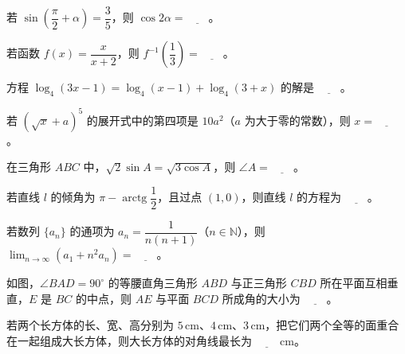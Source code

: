 \begin{question}
若 $\sin\left(\dfrac{\pi}{2}+\alpha\right)=\dfrac{3}{5}$，则 $\cos 2\alpha=\underline{\qquad}$。

\end{question}
\begin{question}
若函数 $f(x)=\dfrac{x}{x+2}$，则 $f^{-1}\left(\dfrac{1}{3}\right)=\underline{\qquad}$。

\end{question}
\begin{question}
方程 $\log_4(3x-1)=\log_4(x-1)+\log_4(3+x)$ 的解是 $\underline{\qquad}$。

\end{question}
\begin{question}
若 $(\sqrt{x}+a)^5$ 的展开式中的第四项是 $10a^2$（$a$ 为大于零的常数），则 $x=\underline{\qquad}$。

\end{question}
\begin{question}
在三角形 $ABC$ 中，$\sqrt{2}\sin A=\sqrt{3\cos A}$，则 $\angle A=\underline{\qquad}$。

\end{question}
\begin{question}
若直线 $l$ 的倾角为 $\pi-\operatorname{arctg}\dfrac{1}{2}$，且过点 $(1,0)$，则直线 $l$ 的方程为 $\underline{\qquad}$。

\end{question}
\begin{question}
若数列 $\{a_n\}$ 的通项为 $a_n=\dfrac{1}{n(n+1)}$（$n\in\mathbb{N}$），则 $\displaystyle\lim_{n\to\infty}(a_1+n^2a_n)=\underline{\qquad}$。

\Needspace{0.4\textheight}
\end{question}
\begin{question}
如图，$\angle BAD=90^\circ$ 的等腰直角三角形 $ABD$ 与正三角形 $CBD$ 所在平面互相垂直，$E$ 是 $BC$ 的中点，则 $AE$ 与平面 $BCD$ 所成角的大小为 $\underline{\qquad}$。
\nopagebreak[4]
\begin{center}\end{center}
\nopagebreak[4]
\end{question}
\begin{question}
若两个长方体的长、宽、高分别为 $5\,\mathrm{cm}$、$4\,\mathrm{cm}$、$3\,\mathrm{cm}$，把它们两个全等的面重合在一起组成大长方体，则大长方体的对角线最长为 $\underline{\qquad}\,\mathrm{cm}$。

\end{question}
